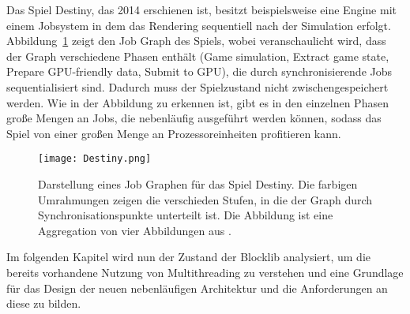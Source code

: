 Das Spiel Destiny, das 2014 erschienen ist, besitzt beispielsweise eine Engine mit einem Jobsystem in dem das Rendering sequentiell nach der Simulation erfolgt. Abbildung~\ref{fig:destiny-jobgraph} zeigt den Job Graph des Spiels, wobei veranschaulicht wird, dass der Graph verschiedene Phasen enthält (Game simulation, Extract game state, Prepare GPU-friendly data, Submit to GPU), die durch synchronisierende Jobs sequentialisiert sind. Dadurch muss der Spielzustand nicht zwischengespeichert werden. Wie in der Abbildung zu erkennen ist, gibt es in den einzelnen Phasen große Mengen an Jobs, die nebenläufig ausgeführt werden können, sodass das Spiel von einer großen Menge an Prozessoreinheiten profitieren kann.

\begin{figure}
	\texttt{[image: Destiny.png]}
	 \caption{Darstellung eines Job Graphen für das Spiel Destiny. Die farbigen Umrahmungen zeigen die verschieden Stufen, in die der Graph durch Synchronisationspunkte unterteilt ist. Die Abbildung ist eine Aggregation von vier Abbildungen aus \cite[S.~39~ff.]{Tatarchuk2014}.}\label{fig:destiny-jobgraph}
\end{figure}

Im folgenden Kapitel wird nun der Zustand der Blocklib analysiert, um die bereits vorhandene Nutzung von Multithreading zu verstehen und eine Grundlage für das Design der neuen nebenläufigen Architektur und die Anforderungen an diese zu bilden.

